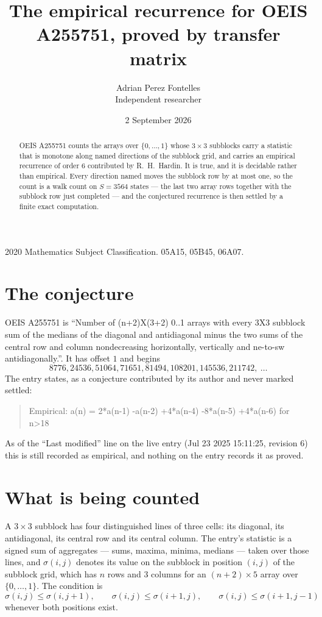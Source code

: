 \documentclass[11pt,a4paper]{article}
\title{The empirical recurrence for OEIS A255751, proved by transfer matrix}
\author{Adrian Perez Fontelles\\ \small Independent researcher}
\date{2 September 2026}
\theoremstyle{plain}
\theoremstyle{definition}
\begin{document}
\maketitle

\begin{abstract}
OEIS A255751 counts the arrays over $\{0,\dots,1\}$ whose $3\times3$ subblocks carry a
statistic that is monotone along named directions of the subblock grid, and carries an
empirical recurrence of order $6$ contributed by R.~H.~Hardin. It is true, and it is
decidable rather than empirical. Every direction named moves the subblock row by at most one,
so the count is a walk count on $S=3564$ states --- the last two array rows together with the
subblock row just completed --- and the conjectured recurrence is then settled by a finite
exact computation.
\end{abstract}

\noindent\small 2020 Mathematics Subject Classification. 05A15, 05B45, 06A07.\normalsize

\section{The conjecture}

OEIS A255751 is ``Number of (n+2)X(3+2) 0..1 arrays with every 3X3 subblock sum of the medians of the diagonal and antidiagonal minus the two sums of the central row and column nondecreasing horizontally, vertically and ne-to-sw antidiagonally.''. It has offset $1$ and begins
\[
8776, 24536, 51064, 71651, 81494, 108201, 145536, 211742,\ \dots
\]
The entry states, as a conjecture contributed by its author and never marked settled:
\begin{quote}
Empirical: a(n) = 2*a(n-1) -a(n-2) +4*a(n-4) -8*a(n-5) +4*a(n-6) for n>18
\end{quote}
As of the ``Last modified'' line on the live entry (Jul 23 2025 15:11:25, revision 6) this is still
recorded as empirical, and nothing on the entry records it as proved.

\section{What is being counted}

A $3\times3$ subblock has four distinguished lines of three cells: its diagonal, its
antidiagonal, its central row and its central column. The entry's statistic is a signed sum of
aggregates --- sums, maxima, minima, medians --- taken over those lines, and $\sigma(i,j)$
denotes its value on the subblock in position $(i,j)$ of the subblock grid, which has $n$ rows
and $3$ columns for an $(n+2)\times5$ array over $\{0,\dots,1\}$. The condition is
\[
\sigma(i,j)\le\sigma(i,j+1),\qquad \sigma(i,j)\le\sigma(i+1,j),\qquad \sigma(i,j)\le\sigma(i+1,j-1)
\]
whenever both positions exist.
\end{document}

